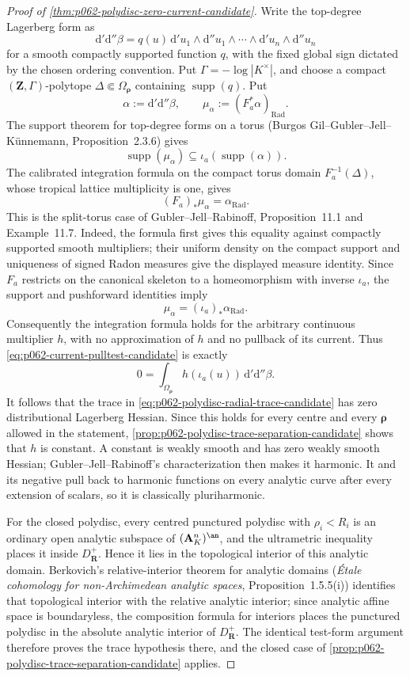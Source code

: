 \begin{proof}[Proof of \cref{thm:p062-polydisc-zero-current-candidate}]
Write the top-degree Lagerberg form as
\[
 \mathrm d'\mathrm d''\beta
 =q(u)\,\mathrm d'u_1\wedge\mathrm d''u_1\wedge\cdots
          \wedge\mathrm d'u_n\wedge\mathrm d''u_n
\]
for a smooth compactly supported function \(q\), with the fixed global
sign dictated by the chosen ordering convention. Put
\(\Gamma=-\log|K^\times|\), and choose a compact
\((\mathbf Z,\Gamma)\)-polytope \(\Delta\Subset
\Omega_{\boldsymbol\rho}\) containing \(\operatorname{supp}(q)\). Put
\[
 \alpha:=\mathrm d'\mathrm d''\beta,\qquad
 \mu_\alpha:=(F_a^*\alpha)_{\mathrm{Rad}}.
\]
The support theorem for top-degree forms on a torus
(Burgos Gil--Gubler--Jell--K\"unnemann, Proposition~2.3.6) gives
\[
 \operatorname{supp}(\mu_\alpha)
 \subseteq\iota_a(\operatorname{supp}(\alpha)).
\]
The calibrated integration formula on the compact torus domain
\(F_a^{-1}(\Delta)\), whose tropical lattice multiplicity is one, gives
\[
            (F_a)_*\mu_\alpha=\alpha_{\mathrm{Rad}}.
\]
This is the split-torus case of Gubler--Jell--Rabinoff,
Proposition~11.1 and Example~11.7. Indeed, the formula first gives this
equality against compactly supported
smooth multipliers; their uniform density on the compact support and
uniqueness of signed Radon measures give the displayed measure identity.
Since \(F_a\) restricts on the canonical skeleton to a homeomorphism with
inverse \(\iota_a\), the support and pushforward identities imply
\[
             \mu_\alpha=(\iota_a)_*\alpha_{\mathrm{Rad}}.
\]
Consequently the integration formula holds for the arbitrary continuous
multiplier \(h\), with no approximation of \(h\) and no pullback of its
current. Thus
\eqref{eq:p062-current-pulltest-candidate} is exactly
\[
 0=\int_{\Omega_{\boldsymbol\rho}}
       h(\iota_a(u))\,\mathrm d'\mathrm d''\beta.
\]
It follows that the trace in
\eqref{eq:p062-polydisc-radial-trace-candidate} has zero distributional
Lagerberg Hessian. Since this holds for every centre and every
\(\boldsymbol\rho\) allowed in the statement,
\cref{prop:p062-polydisc-trace-separation-candidate} shows that \(h\) is
constant. A constant is weakly smooth and has zero weakly smooth Hessian;
Gubler--Jell--Rabinoff's characterization then makes it harmonic. It and
its negative pull back to harmonic functions on every analytic curve after
every extension of scalars, so it is classically pluriharmonic.

For the closed polydisc, every centred punctured polydisc with
\(\rho_i<R_i\) is an ordinary open analytic subspace of
\((\mathbf A_K^n)^{\an}\), and the ultrametric inequality places it inside
\(D^+_{\mathbf R}\). Hence it lies in the topological interior of this
analytic domain. Berkovich's relative-interior theorem for analytic
domains (\emph{\'Etale cohomology for non-Archimedean analytic spaces},
Proposition~1.5.5(i)) identifies that topological interior with the
relative analytic interior; since analytic affine space is boundaryless,
the composition formula for interiors places the punctured polydisc in
the absolute analytic interior of \(D^+_{\mathbf R}\). The identical test-form argument
therefore proves the trace hypothesis there, and the closed case of
\cref{prop:p062-polydisc-trace-separation-candidate} applies.
\end{proof}
